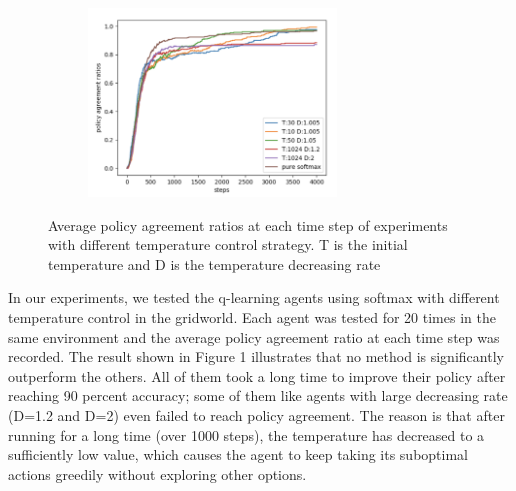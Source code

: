 \documentclass{article}
\begin{document}
\begin{figure}[h]
	\begin{subfigure}{0.5\textwidth}
		\includegraphics[width=0.9\linewidth, height=5cm]{images/temp_0_4000.png}
		\caption{}
	\end{subfigure}
	\caption{Average policy agreement ratios at each time step of experiments with different temperature control strategy. T is the initial temperature and D is the temperature decreasing rate}
\end{figure}

In our experiments, we tested the q-learning agents using softmax with different temperature control in the gridworld. Each agent was tested for 20 times in the same environment and the average policy agreement ratio at each time step was recorded. The result shown in Figure 1 illustrates that no method is significantly outperform the others. All of them took a long time to improve their policy after reaching 90 percent accuracy; some of them like agents with large decreasing rate (D=1.2 and D=2) even failed to reach policy agreement. The reason is that after running for a long time (over 1000 steps), the temperature has decreased to a sufficiently low value, which causes the agent to keep taking its suboptimal actions greedily without exploring other options.
\end{document}
